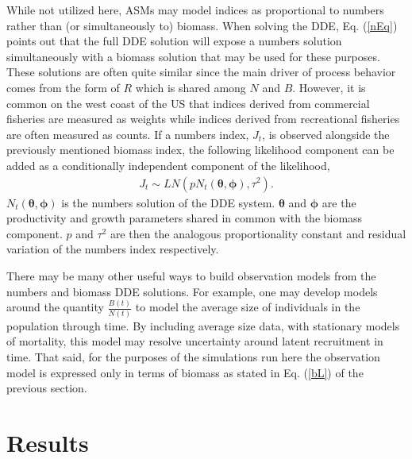 %
While not utilized here, ASMs may model %
indices as proportional to numbers rather than (or simultaneously to)
biomass. When solving the DDE, Eq. (\ref{nEq}) points out that the full DDE
solution will expose a numbers solution simultaneously with a biomass solution
that may be used for these purposes. These solutions are often quite similar
since the main driver of process behavior comes from the form of $R$ which is
shared among $N$ and $B$.
However, it is common on the west coast of the US that indices derived from commercial
fisheries are measured as weights %
while indices derived from recreational fisheries are often measured as counts.
If a numbers index, $J_t$, is observed alongside the previously
mentioned biomass index, the following likelihood component can be added as a %
conditionally independent component of the likelihood, %
\begin{align}
J_t \sim LN(p N_t(\bm{\theta}, \bm{\phi}), \tau^{2}) \label{nL}.
\end{align}
%
$N_t(\bm{\theta}, \bm{\phi})$ is the numbers solution of the DDE system.
$\bm{\theta}$ and $\bm{\phi}$ are the productivity and growth parameters shared in 
common with the biomass component. $p$ and $\tau^2$ are then the analogous
proportionality constant and residual variation of the numbers index respectively.

%
\clearpage
There may be many other useful ways to build observation models from the 
numbers and biomass DDE solutions. For example, one may develop 
models around the quantity $\frac{B(t)}{N(t)}$ to model the average size of 
individuals in the population through time. By including average size data, 
with stationary models of mortality, this model may resolve uncertainty around 
latent recruitment in time. 
That said, for the purposes of the simulations run here the observation model 
is expressed only in terms of biomass as stated in Eq. (\ref{bL}) of the previous section.

%
%

\section{Results}

